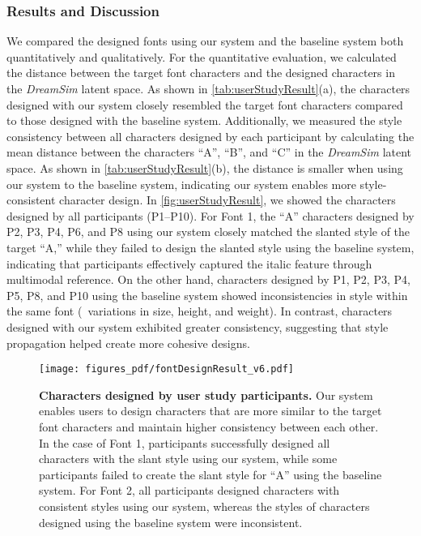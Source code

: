 \subsubsection{Results and Discussion}
We compared the designed fonts using our system and the baseline system both quantitatively and qualitatively.
For the quantitative evaluation, we calculated the distance between the target font characters and the designed characters in the \textit{DreamSim} latent space.
As shown in \autoref{tab:userStudyResult}(a), the characters designed with our system closely resembled the target font characters compared to those designed with the baseline system.
Additionally, we measured the style consistency between all characters designed by each participant by calculating the mean distance between the characters ``A'', ``B'', and ``C'' in the \textit{DreamSim} latent space.
As shown in \autoref{tab:userStudyResult}(b), the distance is smaller when using our system to the baseline system, indicating our system enables more style-consistent character design.
In \autoref{fig:userStudyResult}, we showed the characters designed by all participants (P1--P10).
For Font 1, the ``A'' characters designed by P2, P3, P4, P6, and P8 using our system closely matched the slanted style of the target ``A,'' while they failed to design the slanted style using the baseline system, indicating that participants effectively captured the italic feature through multimodal reference.
On the other hand, characters designed by P1, P2, P3, P4, P5, P8, and P10 using the baseline system showed inconsistencies in style within the same font (\eg~variations in size, height, and weight).
In contrast, characters designed with our system exhibited greater consistency, suggesting that style propagation helped create more cohesive designs.

\begin{figure}[ht]
    \centering
    \texttt{[image: figures\_pdf/fontDesignResult\_v6.pdf]}
    \caption{
    \textbf{Characters designed by user study participants.}
    Our system enables users to design characters that are more similar to the target font characters and maintain higher consistency between each other.
    In the case of Font 1, participants successfully designed all characters with the slant style using our system, while some participants failed to create the slant style for ``A'' using the baseline system.
    For Font 2, all participants designed characters with consistent styles using our system, whereas the styles of characters designed using the baseline system were inconsistent.
}
\label{fig:userStudyResult}
\end{figure}


